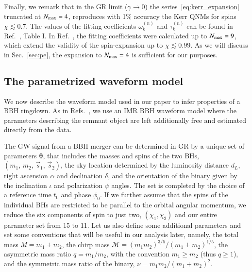 \documentclass[twocolumn,
               prd,
               aps,
               superscriptaddress,
               tightenlines,
               nofootinbib,
               eqsecnum,
               amsfonts,
               amsmath,
               longbibliography]{revtex4-1}
\begin{document}
Finally, we remark that in the GR limit ($\gamma \to 0$)
the series~\eqref{eq:kerr_expansion} truncated at $N_{\rm max} = 4$, reproduces with 1\% accuracy
the Kerr QNMs for spins $\chi \lesssim 0.7$.
%
The values of the fitting coefficients $\omega_{k}^{(n)}$ and $\tau_{k}^{(n)}$
can be found in Ref.~\cite{Maselli:2019mjd}, Table I.
%
In Ref.~\cite{Carullo:2021dui}, the fitting coefficients were calculated up to $N_{\rm max} = 9$,
which extend the validity of the spin-expansion up to $\chi \lesssim 0.99$.
%
As we will discuss in Sec.~\ref{sec:pe}, the expansion to $N_{\rm max} = 4$ is
sufficient for our purposes.

\subsection{The parametrized waveform model}
\label{sec:review_pSEOB}

We now describe the waveform model used in our paper to infer properties of a
BBH ringdown.
%
As in Refs.~\cite{Brito:2018rfr,Ghosh:2021mrv}, we use an IMR BBH waveform
model where the parameters describing the remnant object are left additionally
free and estimated directly from the data.

The GW signal from a BBH merger can be determined in GR by a unique set of
parameters $\bm{\theta}$, that includes the masses and spins of the two BHs,
$(m_1,\, m_2,\, \vec{s}_1,\, \vec{s}_2)$, the sky location determined by the
luminosity distance $d_L$, right ascension $\alpha$ and declination $\delta$,
and the orientation of the binary given by the inclination $\iota$ and polarization $\psi$
angles.
%
The set is completed by the choice of a reference time $t_0$ and phase
$\phi_0$. If we further assume that the spins of the individual BHs are
restricted to be parallel to the orbital angular momentum, we reduce the six
components of spin to just two, $(\chi_1, \chi_2)$ and our entire parameter set
from 15 to 11.
%
Let us also define some additional parameters and set some conventions that
will be useful in our analysis later, namely, the total mass
%
$M=m_1+m_2$,
%
the chirp mass
%
$\mathcal {M}=(m_{1}m_{2})^{3/5}/(m_{1}+m_{2})^{1/5}$,
%
the asymmetric mass ratio $q=m_1/m_2$, with the convention $m_1 \geqslant m_2$ (thus $q \geqslant 1$),
and the symmetric mass ratio of the binary, $\nu = m_1m_2/(m_1+m_2)^2$.
\end{document}
